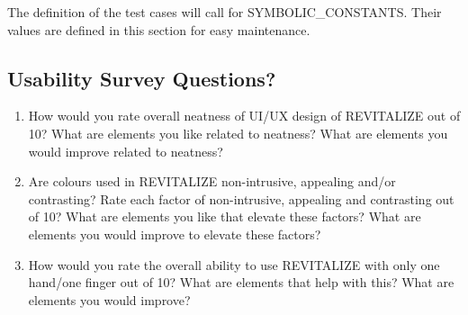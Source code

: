 \documentclass[12pt, titlepage]{article}
\begin{document}
The definition of the test cases will call for SYMBOLIC\_CONSTANTS.
Their values are defined in this section for easy maintenance.

\subsection{Usability Survey Questions?}


\begin{enumerate}
    \item How would you rate overall neatness of UI/UX design of REVITALIZE out of 10? What are elements you like related to neatness? What are elements you would improve related to neatness?
    \item Are colours used in REVITALIZE non-intrusive, appealing and/or contrasting? Rate each factor of non-intrusive, appealing and contrasting out of 10? What are elements you like that elevate these factors? What are elements you would improve to elevate these factors?
    \item How would you rate the overall ability to use REVITALIZE with only one hand/one finger out of 10? What are elements that help with this? What are elements you would improve?
\end{enumerate}
\end{document}
